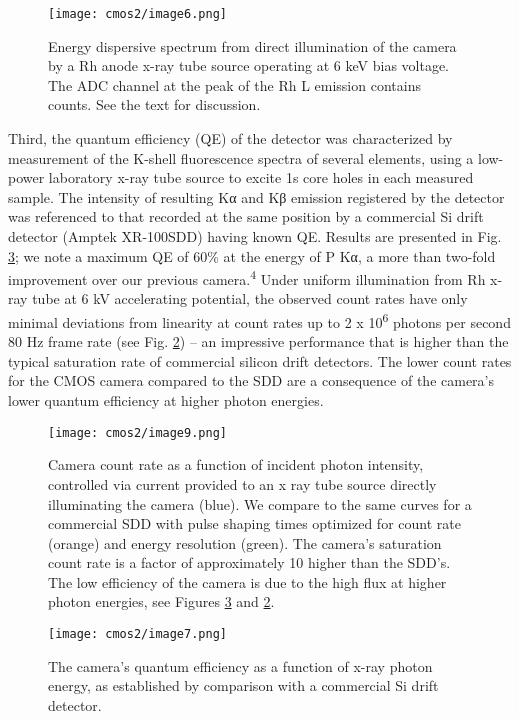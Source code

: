\begin{figure}[h] \label{cmos2_image6}
\caption{
 Energy dispersive spectrum from direct illumination of the
camera by a Rh anode x-ray tube source operating at 6 keV bias voltage.
The ADC channel at the peak of the Rh L emission contains \(^{}\)
counts. See the text for discussion.
}
\centering
\texttt{[image: cmos2/image6.png]}
\end{figure}

Third, the quantum efficiency (QE) of the detector was characterized by
measurement of the K-shell fluorescence spectra of several elements,
using a low-power laboratory x-ray tube source to excite 1s core holes
in each measured sample. The intensity of resulting Kα and Kβ emission
registered by the detector was referenced to that recorded at the same
position by a commercial Si drift detector (Amptek XR-100SDD) having
known QE. Results are presented in Fig. \ref{cmos2_image7}; we note a maximum QE of 60\%
at the energy of P Kα, a more than two-fold improvement over our
previous camera.\textsuperscript{4} Under uniform illumination from Rh
x-ray tube at 6 kV accelerating potential, the observed count rates
have only minimal deviations from linearity at count rates up to 2 x
10\textsuperscript{6} photons per second 80 Hz frame rate (see Fig. \ref{cmos2_image9})
-- an impressive performance that is higher than the typical saturation
rate of commercial silicon drift detectors. The lower count rates for
the CMOS camera compared to the SDD are a consequence of the camera's
lower quantum efficiency at higher photon energies.

\begin{figure}[h] 
\caption{
 Camera count rate as a function of incident photon intensity,
controlled via current provided to an x ray tube source directly
illuminating the camera (blue). We compare to the same curves for a
commercial SDD with pulse shaping times optimized for count rate
(orange) and energy resolution (green). The camera's saturation count
rate is a factor of approximately 10 higher than the SDD's. The low
efficiency of the camera is due to the high flux at higher photon
energies, see Figures \ref{cmos2_image7} and \ref{cmos2_image9}.
}\label{cmos2_image9}
\centering
\texttt{[image: cmos2/image9.png]}
\end{figure}

\begin{figure}[h] \label{cmos2_image7}
\caption{
 The camera's quantum efficiency as a function of x-ray photon
energy, as established by comparison with a commercial Si drift
detector.
}
\centering
\texttt{[image: cmos2/image7.png]}
\end{figure}

